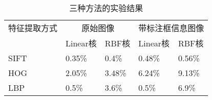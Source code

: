 \begin{table}[htbp]
  \centering
  \caption{三种方法的实验结果}
  \label{tab:jieguozong}
    \begin{tabularx}{\linewidth}{l|X|X|X|X}
      \toprule[1.5pt]%
 \multicolumn{1}{c|}{特征提取方式} & \multicolumn{2}{c|}{原始图像} & \multicolumn{2}{c}{带标注框信息图像}\\\cline{2-5}
      & Linear核 & RBF核 & Linear核 & RBF核 \\ \hline
      SIFT  & 0.35\% & 0.4\% & 0.48\% & 0.56\% \\ \hline
      HOG   & 2.05\% & 3.48\% & 6.24\% & 9.13\% \\ \hline
      LBP   & 0.5\% & 3.6\% & 0.5\% & 6.9\% \\
     \bottomrule[1.5pt]
    \end{tabularx}\\[2pt]
\end{table}






